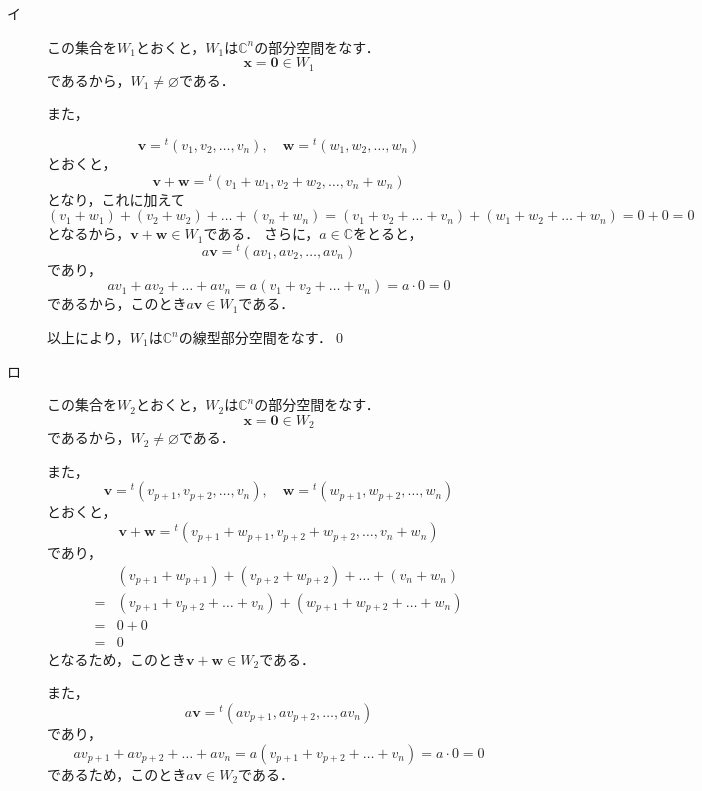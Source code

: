 \documentclass[uplatex,dvipdfmx,a4paper,10pt,fleqn]{jsarticle}
\begin{document}
\begin{leftbar}
    \begin{description}
        \item[イ] この集合を$W_1$とおくと，$W_1$は$\mathbb{C}^n$の部分空間をなす．
        \[
            \bm{x} =\bm{0} \in  W_1
        \] 
        であるから，$W_1 \ne \varnothing$である．
        
        また，

        \[
            \bm{v} = {}^t ( v_{1} , v_{2} , \ldots ,v_{n} ) , \quad \bm{w} = {}^t (w_{1} , w_{2} , \ldots , w_{n} )
        \]
        とおくと，
        \[
         \bm{v}+\bm{w}={}^t (v_1+w_1,v_2+w_2,\ldots,v_n + w_n)
        \]
        となり，これに加えて
        \[
           ( v_1+w_1)+(v_2+w_2) + \dots + (v_n + w_n) =(v_1+v_2+\dots + v_n ) + (w_1+w_2+\dots + w_n )=0+0=0
        \]
        となるから，$\bm{v}+\bm{w} \in W_1$である．
        さらに，$a \in \mathbb{C}$をとると，
        \[
            a \bm{v}={}^t ( av_{1} ,av_{2} , \ldots , av_{n} )
        \]
        であり，
        \[
           av_1 + av_2+ \dots + av_n = a (v_1 + v_2 + \dots + v_n) = a \cdot 0 =0
        \]
        であるから，このとき$ a \bm{v} \in W_1$である．
        
        以上により，$W_1$は$\mathbb{C}^n$の線型部分空間をなす．\qed 
        \item[ロ] この集合を$W_2$とおくと，$W_2$は$\mathbb{C}^n$の部分空間をなす．
        \[
            \bm{x} = \bm{0} \in W_2
        \]
        であるから，$W_2 \ne \varnothing$である．
        
        また，
        \[
            \bm{v} ={}^t (v_{p+1} , v_{p+2} , \ldots , v_{n} ) , \quad \bm{w} ={}^t ( w_{p+1} , w_{p+2} , \ldots , w_{n} )
        \]
        とおくと，
        \[
            \bm{v}+ \bm{w} = {}^t (v_{p+1}+w_{p+1},v_{p+2}+w_{p+2},\ldots,v_n + w_n)
        \]
        であり，
        \begin{align*}
           &( v_{p+1}+w_{p+1}) +(v_{p+2}+w_{p+2})+ \dots + (v_n+w_n) \\
           =& (v_{p+1}+v_{p+2}+\dots+v_n)+(w_{p+1}+w_{p+2}+\dots+w_n) \\
           =&0+0\\
           =&0
        \end{align*}
        となるため，このとき$\bm{v}+\bm{w} \in W_2$である．

        また，
        \[
            a\bm{v} = {}^t (av_{p+1},av_{p+2},\ldots,av_n)
        \]
        であり，
        \[
            av_{p+1} + av_{p+2}+\dots + av_n =a (v_{p+1}+v_{p+2}+\dots+v_n) = a\cdot 0 =0
        \]
        であるため，このとき$a \bm{v} \in W_2$である．


\end{description}
\end{leftbar}
\end{document}
